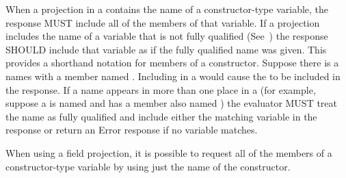 \documentclass[justify]{nasa-ese}
\begin{document}
When a projection in a \CE contains the name of a constructor-type variable,
the response MUST include all of the members of that variable. If a
projection includes the name of a variable that is not fully qualified
(See~) the response SHOULD include that variable as if
the fully qualified name was given. This provides a shorthand notation for
members of a constructor. Suppose there is a \Structure names  with
a member named . Including  in a \CE would cause the
 to be included in the response. If a name appears in more than
one place in a \Dataset (for example, suppose a \Grid is named  and
has a member \Array also named ) the \CE evaluator MUST treat the
name as fully qualified and include either the matching variable in the
response or return an Error response if no variable matches.

When using a field projection, it is possible to request all of the members
of a constructor-type variable by using just the name of the constructor.
\end{document}
